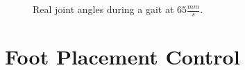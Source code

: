 				\begin{figure}
					\centering
					\caption{Real joint angles during a gait at $65 \frac{mm}{s}$.}
					\label{fig::real_cpg_joints}
				\end{figure}	



	\section{Foot Placement Control}
		\label{sec::foot_placement_control}

